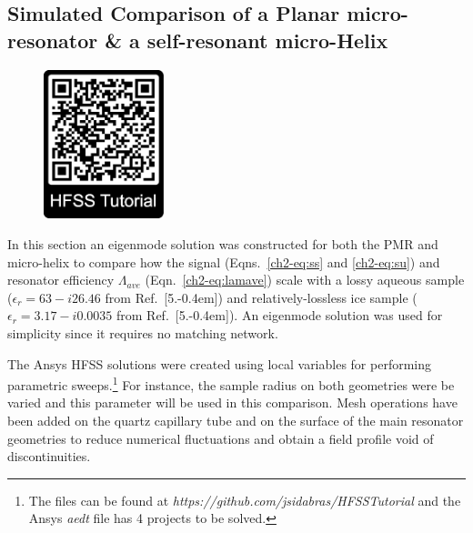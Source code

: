 \subsection{Simulated Comparison of a Planar micro-resonator \& a self-resonant micro-Helix} 

\begin{figure}
\centering
\includegraphics[width=3.5cm]{Kapitel/Appendix/HFSSTutQR.eps}
\end{figure}

In this section an eigenmode solution was constructed for both the PMR and micro-helix to compare how the signal (Eqns.~\ref{ch2-eq:ss} and \ref{ch2-eq:su}) and resonator efficiency $\Lambda_{ave}$ (Eqn.~\ref{ch2-eq:lamave}) scale with a lossy aqueous sample ($\epsilon_r = 63 - i26.46$ from Ref.~[5.\kern-0.4em]) and relatively-lossless ice sample ($\epsilon_r=3.17-i0.0035$ from Ref.~[5.\kern-0.4em]). An eigenmode solution was used for simplicity since it requires no matching network. 

The Ansys HFSS solutions were created using local variables for performing parametric sweeps.\footnote{The files can be found at \textit{https://github.com/jsidabras/HFSSTutorial} and the Ansys \textit{aedt} file has 4 projects to be solved.} For instance, the sample radius on both geometries were be varied and this parameter will be used in this comparison. Mesh operations have been added on the quartz capillary tube and on the surface of the main resonator geometries to reduce numerical fluctuations and obtain a field profile void of discontinuities. 

